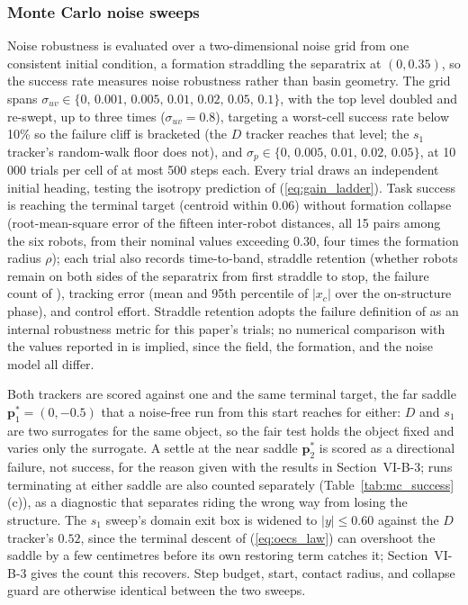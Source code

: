 \documentclass[lettersize,journal]{IEEEtran}
\begin{document}
\subsubsection{Monte Carlo noise sweeps}
Noise robustness is evaluated over a two-dimensional noise grid from
one consistent initial condition, a formation straddling the separatrix
at $(0, 0.35)$, so the success rate measures noise robustness rather
than basin geometry. The grid spans $\sigma_{uv} \in \{0,\,
0.001,\, 0.005,\, 0.01,\, 0.02,\, 0.05,\, 0.1\}$, with the top
level doubled and re-swept, up to three times ($\sigma_{uv} = 0.8$),
targeting a worst-cell success rate below 10\% so the failure cliff is
bracketed (the $D$ tracker reaches that level; the $s_1$ tracker's
random-walk floor does not), and $\sigma_p \in
\{0,\, 0.005,\, 0.01,\, 0.02,\, 0.05\}$, at 10\,000 trials per cell of
at most 500 steps each. Every trial draws an independent initial
heading, testing the isotropy prediction of (\ref{eq:gain_ladder}).
Task success is reaching the terminal target (centroid
within 0.06) without formation collapse (root-mean-square error of the
fifteen inter-robot distances, all 15 pairs among the six robots, from
their nominal values exceeding 0.30, four times the formation radius
$\rho$); each trial also
records time-to-band, straddle retention (whether robots remain on
both sides of the separatrix from first straddle to stop, the failure
count of \cite{9}), tracking error (mean and 95th percentile of
$|x_c|$ over the on-structure phase), and control effort. Straddle
retention adopts the failure definition of \cite{9} as an internal
robustness metric for this paper's trials; no numerical comparison
with the values reported in \cite{9} is implied, since the field, the
formation, and the noise model all differ.

Both trackers are scored against one and the same terminal target, the
far saddle $\mathbf{p}^*_1 = (0, -0.5)$ that a noise-free run from this
start reaches for either: $D$ and $s_1$ are two surrogates for the same
object, so the fair test holds the object fixed and varies only the
surrogate. A settle at the near saddle $\mathbf{p}^*_2$ is scored as a
directional failure, not success, for the reason given with the results
in Section~\mbox{VI-B-3}; runs terminating at either saddle are also
counted separately (Table~\ref{tab:mc_success}(c)), as a diagnostic that
separates riding the wrong way from losing the structure. The $s_1$
sweep's domain exit box is widened to $|y| \leq 0.60$ against the $D$
tracker's $0.52$, since the terminal descent of (\ref{eq:oecs_law}) can
overshoot the saddle by a few centimetres before its own restoring term
catches it; Section~\mbox{VI-B-3} gives the count this recovers. Step
budget, start, contact radius, and collapse guard are otherwise
identical between the two sweeps.
\end{document}
